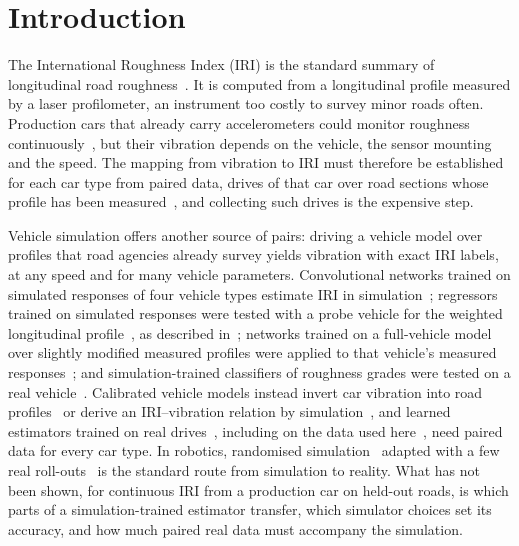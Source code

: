 \section{Introduction}
\label{sec:intro}
The International Roughness Index (IRI) is the standard summary of longitudinal road roughness~\cite{sayers1986tp45,astm_e1926}.
It is computed from a longitudinal profile measured by a laser profilometer, an instrument too costly to survey minor roads often.
Production cars that already carry accelerometers could monitor roughness continuously~\cite{sattar2018review,levenberg2021lira}, but their vibration depends on the vehicle, the sensor mounting and the speed.
The mapping from vibration to IRI must therefore be established for each car type from paired data, drives of that car over road sections whose profile has been measured~\cite{sayers1986tp46}, and collecting such drives is the expensive step.

Vehicle simulation offers another source of pairs: driving a vehicle model over profiles that road agencies already survey yields vibration with exact IRI labels, at any speed and for many vehicle parameters.
Convolutional networks trained on simulated responses of four vehicle types estimate IRI in simulation~\cite{jeong2020cnn}; regressors trained on simulated responses were tested with a probe vehicle for the weighted longitudinal profile~\cite{nitsche2014wlp}, as described in~\cite{bajic2021ml}; networks trained on a full-vehicle model over slightly modified measured profiles were applied to that vehicle's measured responses~\cite{ngwangwa2014exp}; and simulation-trained classifiers of roughness grades were tested on a real vehicle~\cite{speedadaptive2025}.
Calibrated vehicle models instead invert car vibration into road profiles~\cite{skar2024inversion,agebjar2025fusion} or derive an IRI--vibration relation by simulation~\cite{wu2023calib}, and learned estimators trained on real drives~\cite{sang2024iri,jeongjo2024irinet}, including on the data used here~\cite{bajic2021ml}, need paired data for every car type.
In robotics, randomised simulation~\cite{tobin2017dr,peng2018dr} adapted with a few real roll-outs~\cite{chebotar2019simopt} is the standard route from simulation to reality.
What has not been shown, for continuous IRI from a production car on held-out roads, is which parts of a simulation-trained estimator transfer, which simulator choices set its accuracy, and how much paired real data must accompany the simulation.

